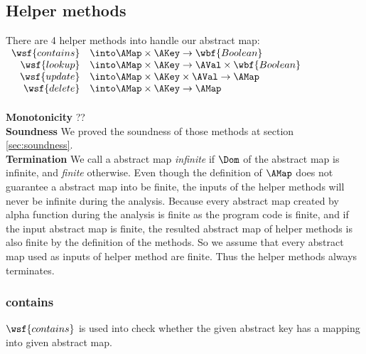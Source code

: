 \subsection{Helper methods}
There are 4 helper methods into handle our abstract map:\\

$\begin{array}{rl}
\wsf{contains} & \into \AMap \times \AKey \rightarrow \wbf{Boolean} \\
\wsf{lookup} & \into \AMap \times \AKey \rightarrow \AVal \times \wbf{Boolean} \\
\wsf{update} & \into \AMap \times \AKey \times \AVal \rightarrow \AMap \\
\wsf{delete} & \into \AMap \times \AKey \rightarrow \AMap \\
\end{array}$\\\\

\textbf{Monotonicity } ??\\

\textbf{Soundness }
We proved the soundness of those methods at section \ref{sec:soundness}.\\

\textbf{Termination }
We call a abstract map \emph{infinite} if $\Dom$ of the abstract map is infinite,
and \emph{finite} otherwise.
Even though the definition of $\AMap$ does not guarantee a abstract map into be finite,
the inputs of the helper methods will never be infinite during the analysis.
Because every abstract map created by alpha function during the analysis is finite
as the program code is finite, and if the input abstract map is finite, 
the resulted abstract map of helper methods is also finite by the definition of the methods.
So we assume that every abstract map used as inputs of helper method are finite.
Thus the helper methods always terminates.\\

\subsubsection{contains}
$\wsf{contains}$ is used into check whether the given abstract key
has a mapping into given abstract map.\\

